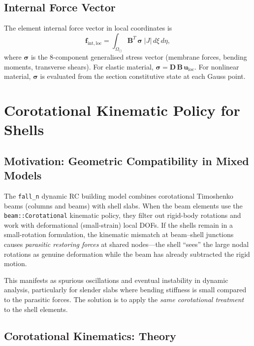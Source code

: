 \subsection{Internal Force Vector}
\label{sec:mitc-internal-force}

The element internal force vector in local coordinates is
\begin{equation}
  \mathbf{f}_{\mathrm{int,loc}}
  = \int_{\Omega_{\Box}} \mathbf{B}^T \, \boldsymbol{\sigma}
    \; \lvert J \rvert \, d\xi\, d\eta
  ,
  \label{eq:f-int}
\end{equation}
where $\boldsymbol{\sigma}$ is the 8-component generalised stress
vector (membrane forces, bending moments, transverse shears).  For
elastic material, $\boldsymbol{\sigma} = \mathbf{D}\,\mathbf{B}\,\mathbf{u}_\mathrm{loc}$.
For nonlinear material, $\boldsymbol{\sigma}$ is evaluated from the
section constitutive state at each Gauss point.

\section{Corotational Kinematic Policy for Shells}
\label{sec:corotational}

\subsection{Motivation: Geometric Compatibility in Mixed Models}
\label{sec:corotational-motivation}

The \texttt{fall\_n} dynamic RC building model combines corotational
Timoshenko beams (columns and beams) with shell slabs.  When the
beam elements use the \texttt{beam::Corotational} kinematic policy,
they filter out rigid-body rotations and work with deformational
(small-strain) local DOFs.  If the shells remain in a small-rotation
formulation, the kinematic mismatch at beam--shell junctions causes
\emph{parasitic restoring forces} at shared nodes---the shell ``sees''
the large nodal rotations as genuine deformation while the beam has
already subtracted the rigid motion.

This manifests as spurious oscillations and eventual instability in
dynamic analysis, particularly for slender slabs where bending
stiffness is small compared to the parasitic forces.  The solution
is to apply the \emph{same corotational treatment} to the shell
elements.

\subsection{Corotational Kinematics: Theory}
\label{sec:cr-theory}

